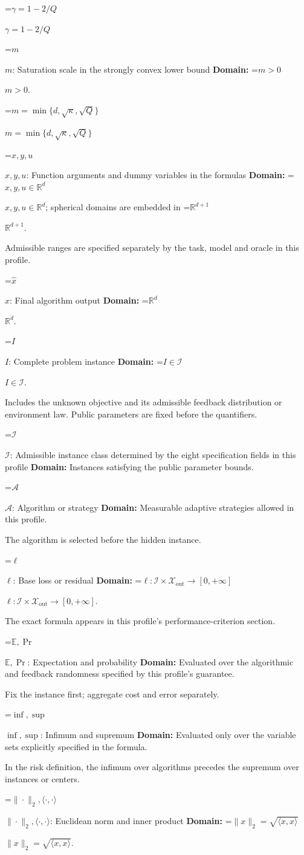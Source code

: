 \documentclass[10pt,a4paper]{article}
\newcommand{\AtlasMath}[1]{\par\begingroup\centering\setbox0=\hbox{$\displaystyle #1$}\ifdim\wd0>1.4\linewidth\typeout{ATLAS WIDE FORMULA: \the\wd0}\fi\ifdim\wd0>\linewidth\resizebox{\linewidth}{!}{\box0}\else\box0\fi\par\endgroup}
\newcommand{\AtlasInlineMath}[1]{\begingroup\setbox0=\hbox{$#1$}\ifdim\wd0>.4\linewidth\endgroup\AtlasMath{#1}\else\endgroup$#1$\fi}
\begin{document}
\AtlasInlineMath{\gamma=1-2/Q}

\AtlasInlineMath{m}: Saturation scale in the strongly convex lower bound \textbf{Domain:} \AtlasInlineMath{m>0}.

\AtlasInlineMath{m=\min\{d,\sqrt\kappa,\sqrt Q\}}

\AtlasInlineMath{x,y,u}: Function arguments and dummy variables in the formulas \textbf{Domain:} \AtlasInlineMath{x,y,u\in\mathbb{R}^d}; spherical domains are embedded in \AtlasInlineMath{\mathbb{R}^{d+1}}.

Admissible ranges are specified separately by the task, model and oracle in this profile.

\AtlasInlineMath{\widehat{x}}: Final algorithm output \textbf{Domain:} \AtlasInlineMath{\mathbb{R}^d}.

\AtlasInlineMath{I}: Complete problem instance \textbf{Domain:} \AtlasInlineMath{I\in\mathcal{I}}.

Includes the unknown objective and its admissible feedback distribution or environment law. Public parameters are fixed before the quantifiers.

\AtlasInlineMath{\mathcal{I}}: Admissible instance class determined by the eight specification fields in this profile \textbf{Domain:} Instances satisfying the public parameter bounds.

\AtlasInlineMath{\mathcal{A}}: Algorithm or strategy \textbf{Domain:} Measurable adaptive strategies allowed in this profile.

The algorithm is selected before the hidden instance.

\AtlasInlineMath{\ell}: Base loss or residual \textbf{Domain:} \AtlasInlineMath{\ell:\mathcal{I}\times\mathcal{X}_{\mathrm{out}}\to[0,+\infty]}.

The exact formula appears in this profile's performance-criterion section.

\AtlasInlineMath{\mathbb{E},\Pr}: Expectation and probability \textbf{Domain:} Evaluated over the algorithmic and feedback randomness specified by this profile's guarantee.

Fix the instance first; aggregate cost and error separately.

\AtlasInlineMath{\inf,\sup}: Infimum and supremum \textbf{Domain:} Evaluated only over the variable sets explicitly specified in the formula.

In the risk definition, the infimum over algorithms precedes the supremum over instances or centers.

\AtlasInlineMath{\|\cdot\|_2,\langle\cdot,\cdot\rangle}: Euclidean norm and inner product \textbf{Domain:} \AtlasInlineMath{\|x\|_2=\sqrt{\langle x,x\rangle}}.
\end{document}
